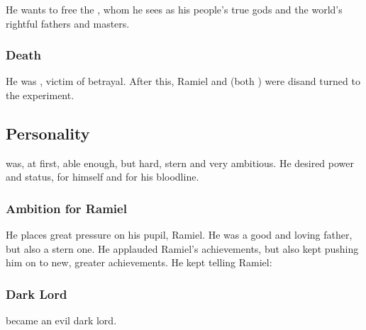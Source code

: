 He wants to free the \banes{}, whom he sees as his people's true gods and the world's rightful fathers and masters. 
  





\subsubsection{Death}
He was , victim of betrayal. 
After this, Ramiel and \Shiaraid{} (both \Mystraacht) were dis\honoured and turned to the \Malach{} experiment. 









\subsection{Personality}
\Zachirah{} was, at first, \honour{}able enough, but hard, stern and very ambitious. 
He desired power and status, for himself and for his bloodline. 





\subsubsection{Ambition for Ramiel}
He places great pressure on his pupil, Ramiel. 
He was a good and loving father, but also a stern one. 
He applauded Ramiel's achievements, but also kept pushing him on to new, greater achievements. 
He kept telling Ramiel: 





\subsubsection{Dark Lord}
\Zachirah{} became an evil dark lord. 

